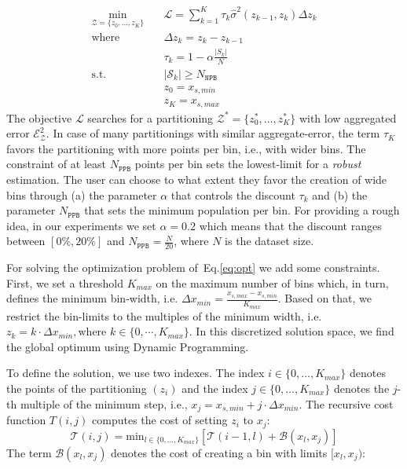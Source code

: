 \documentclass[twoside]{article}
\begin{document}
\begin{equation}
  \label{eq:opt}
\begin{aligned}
  \min_{ \mathcal{Z} = \{z_0, \ldots, z_K\}} \quad & \mathcal{L} = \sum_{k=1}^K \tau_k \hat{\sigma}^2(z_{k-1}, z_k) \Delta z_k \\
  \textrm{where} \quad & \Delta z_k = z_k - z_{k-1} \\
  & \tau_k = 1 - \alpha \frac{|S_k|}{N} \\
  \textrm{s.t.} \quad & |\mathcal{S}_k| \geq N_{\mathtt{NPB}}\\
                                     & z_0 = x_{s,min}\\
                                     & z_K = x_{s, max}
\end{aligned}
\end{equation}
%
The objective \(\mathcal{L}\) searches for a partitioning
\(\mathcal{Z}^* = \{ z_0^*, \ldots, z_K^* \} \) with low aggregated error
\(\mathcal{E}_{\mathcal{Z}}^2\). In case of many partitionings with
similar aggregate-error, the term \(\tau_K\) favors the partitioning
with more points per bin, i.e., with wider bins. The constraint of at
least \(N_{\mathtt{PPB}}\) points per bin sets the lowest-limit for a
\textit{robust} estimation. The user can choose to what extent they
favor the creation of wide bins through (a) the parameter \(\alpha\)
that controls the discount \(\tau_k\) and (b) the parameter
\(N_{\mathtt{PPB}}\) that sets the minimum population per bin. For
providing a rough idea, in our experiments we set \(\alpha = 0.2\)
which means that the discount ranges between \([0\%, 20\%]\) and
\(N_{\mathtt{PPB}} = \frac{N}{20}\), where \(N\) is the dataset size.

For solving the optimization problem of~Eq.\ref{eq:opt} we add some
constraints. First, we set a threshold \(K_{max}\) on the maximum
number of bins which, in turn, defines the minimum bin-width,
i.e. \(\Delta x_{min} = \frac{x_{s, max} - x_{s,min}}{K_{max}}\).
Based on that, we restrict the bin-limits to the multiples of the
minimum width, i.e.
\(z_k = k\cdot \Delta x_{min}, \text{where } k \in \{0 , \cdots,
K_{max}\} \). In this discretized solution space, we find the global
optimum using Dynamic Programming. 

To define the solution, we use two indexes. The index
\(i \in \{0, \ldots, K_{max}\}\) denotes the points of the
partitioning \((z_i)\) and the index \(j \in \{0, \ldots, K_{max}\} \)
denotes the \(j\)-th multiple of the minimum step, i.e.,
\(x_j = x_{s,min} + j \cdot \Delta x_{min}\). The recursive cost
function \(T(i,j)\) computes the cost of setting \(z_i\) to \(x_j\):
\begin{equation}
  \label{eq:recursive_cost}
  \mathcal{T}(i,j) = \mathrm{min}_{l \in \{0, \ldots, K_{max}\}} \left [ \mathcal{T}(i-1, l) + \mathcal{B}(x_l, x_j) \right ]
\end{equation}
%
The term \(\mathcal{B}(x_l, x_j)\) denotes the cost of creating a bin with
limits \([x_l, x_j)\):
\end{document}
